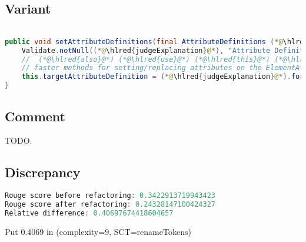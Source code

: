 \documentclass[11pt]{article}
\DeclareRobustCommand{\hlred}[1]{{\sethlcolor{YellowOrange}\hl{#1}}}
\begin{document}
  \subsection{Variant}

  \begin{lstlisting}[language=java]

public void setAttributeDefinitions(final AttributeDefinitions (*@\hlred{judgeExplanation}@*)) {
    Validate.notNull((*@\hlred{judgeExplanation}@*), "Attribute Definitions cannot be null");
    //  (*@\hlred{also}@*) (*@\hlred{use}@*) (*@\hlred{this}@*) (*@\hlred{as}@*) (*@\hlred{alternative}@*) (*@\hlred{or}@*) (*@\hlred{add}@*) (*@\hlred{to}@*) (*@\hlred{a}@*) (*@\hlred{group}@*) (*@\hlred{with}@*) (*@\hlred{other}@*) (*@\hlred{groups}@*) (*@\hlred{for}@*) (*@\hlred{performance}@*) (*@\hlred{in}@*)
    // faster methods for setting/replacing attributes on the ElementAttributes implementation
    this.targetAttributeDefinition = (*@\hlred{judgeExplanation}@*).forName(TEMPLATE_MODE, TARGET_ATTR_NAME);
}
  \end{lstlisting}

  \subsection{Comment}

  TODO.

  \subsection{Discrepancy}

  \begin{lstlisting}[language=java]
Rouge score before refactoring: 0.3422913719943423
Rouge score after refactoring: 0.24328147100424327
Relative difference: 0.40697674418604657
  \end{lstlisting}

  Put 0.4069 in (complexity=9, SCT=renameTokens)
\end{document}

